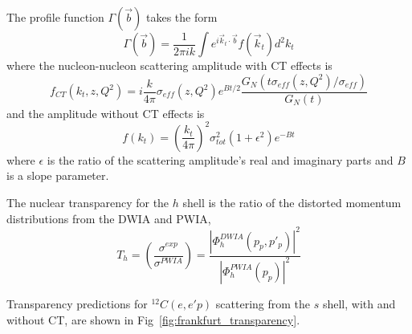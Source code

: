 The profile function $\Gamma(\vec{b})$ takes the form
\begin{equation}
    \Gamma(\vec{b}) = \frac{1}{2\pi i k}
                  \int e^{i\vec{k}_t \cdot \vec{b}} f(\vec{k}_t) d^2k_t
\end{equation}
where the nucleon-nucleon scattering amplitude with CT effects is
\begin{equation}
    f_{CT}(k_t, z, Q^2) = i\frac{k}{4\pi} \sigma_{eff}(z,Q^2) e^{Bt/2}
                          \frac{G_N\left( t \sigma_{eff}(z,Q^2)/\sigma_{eff} \right)}
                               {G_N\left( t \right)}
\end{equation}
and the amplitude without CT effects is
\begin{equation}
    f(k_t) = \left(\frac{k_t}{4\pi}\right)^2
             \sigma_{tot}^2
             (1+\epsilon^2) e^{-Bt}
\end{equation}
where
$\epsilon$ is the ratio of the scattering amplitude's real and imaginary parts
and
$B$ is a slope parameter.

The nuclear transparency for the $h$ shell is the ratio of the distorted
momentum distributions from the DWIA and PWIA,
\begin{equation}
    T_h = \left(\frac{\sigma^{exp}}{\sigma^{PWIA}}\right)
        = \frac{|\Phi^{DWIA}_h(p_p,p'_p)|^2}
               {|\Phi^{PWIA}_h(p_p)|^2}
\end{equation}

Transparency predictions for ${}^{12}C(e,e'p)$ scattering from the $s$ shell,
with and without CT, are shown in Fig~\ref{fig:frankfurt_transparency}.


